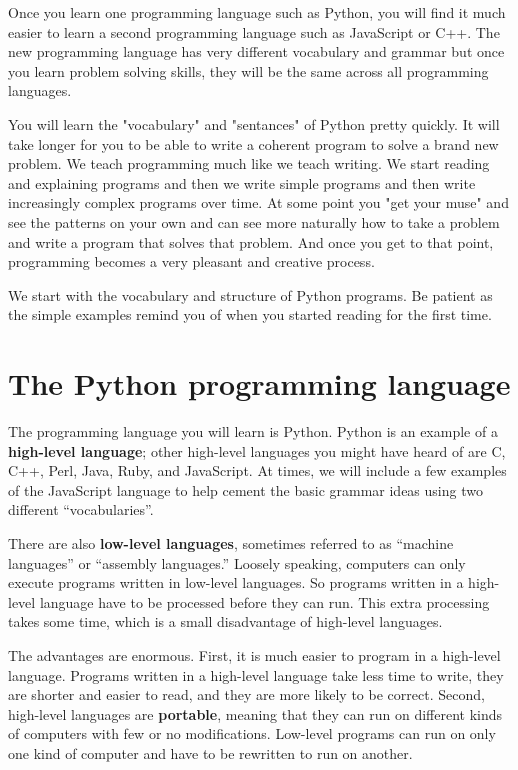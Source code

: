 \documentclass[10pt]{book}
\begin{document}
Once you learn one programming language such as Python, you will 
find it much easier to learn a second programming language such
as JavaScript or C++.  The new programming language has very different 
vocabulary and grammar but once you learn problem solving skills, 
they will be the same across all programming languages.

You will learn the "vocabulary" and "sentances" of Python pretty quickly.
It will take longer for you to be able to write a coherent program
to solve a brand new problem.  We teach programming much like we teach
writing.  We start reading and explaining programs and then we write 
simple programs and then write increasingly complex programs over time.
At some point you "get your muse" and see the patterns on your own
and can see more naturally how to take a problem and 
write a program that solves that problem.  And once you get 
to that point, programming becomes a very pleasant and creative process.  

We start with the vocabulary and structure of Python programs.  Be patient
as the simple examples remind you of when you started reading for the first
time. 

\section{The Python programming language}

The programming language you will learn is Python. Python is
an example of a {\bf high-level language}; other high-level languages
you might have heard of are C, C++, Perl, Java, Ruby, and JavaScript. 
At times, we will include a few examples of the JavaScript language
to help cement the basic grammar ideas using 
two different ``vocabularies''.

There are
also {\bf low-level languages}, sometimes referred to as ``machine
languages'' or ``assembly languages.''  Loosely speaking, computers
can only execute programs written in low-level languages.  So
programs written in a high-level language have to be processed before
they can run.  This extra processing takes some time, which is a small
disadvantage of high-level languages.


The advantages are enormous.  First, it is much easier to program
in a high-level language.  Programs written in a high-level language
take less time to write, they are shorter and easier to read, and they
are more likely to be correct.  Second, high-level languages are {\bf
portable}, meaning that they can run on different kinds of computers
with few or no modifications.  Low-level programs can run on only one
kind of computer and have to be rewritten to run on another.
\end{document}
